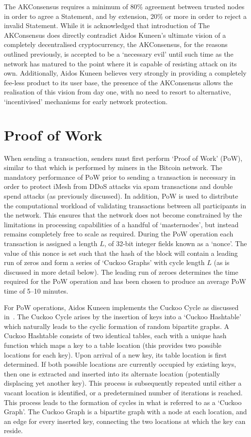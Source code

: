 \documentclass[a4paper,10pt,twocolumn]{article}
\begin{document}
The AKConsensus requires a minimum of 80\% agreement between trusted nodes in order to agree a Statement, and by extension, 
20\% or more in order to reject a invalid Statement.
While it is acknowledged that introduction of The AKConsensus does directly contradict Aidos Kuneen's ultimate 
vision of a completely decentralised cryptocurrency, the AKConsensus, for the reasons outlined previously, is accepted to be a
`necessary evil' until such time as the network has matured to the point where it is capable of resisting attack on its own. 
Additionally, Aidos Kuneen believes very strongly in providing a completely fee-less product to its user base,
the presence of the AKConsensus allows the realisation of this vision from day one, with no need to resort to alternative, `incentivised' 
mechanisms for early network protection.

\section{Proof of Work}
\label{sec:PoW}

When sending a transaction, senders must first perform `Proof of Work' (PoW), similar to that which is performed by miners in the 
Bitcoin network. The mandatory performance of PoW prior to sending a transaction is necessary in order to protect iMesh from DDoS 
attacks via spam transactions and double spend attacks (as previously discussed). In addition, PoW is used to distribute the 
computational workload of validating transactions between all participants in the network. This ensures that the network does not 
become constrained by the limitations in processing capabilities of a handful of `masternodes', but instead remains completely free to 
scale as required. During the PoW operation each transaction is assigned a length \(L\), of 32-bit integer fields known as a `nonce'. 
The value of this nonce is set such that the hash of the block will contain a leading run of zeros and form a series of `Cuckoo Graphs' with cycle length \(L\) (as is discussed in more detail below). The leading run of zeroes determines the time required for the PoW operation and has been chosen to produce an 
average PoW time of 5--10 minutes.

For PoW operations, Aidos Kuneen implements the Cuckoo Cycle as discussed in~\cite{cuckoo}. The Cuckoo Cycle arises by the insertion of
keys into a `Cuckoo Hashtable' which naturally leads to the cyclic formation of random bipartite graphs. A Cuckoo Hashtable consists of 
two identical tables, each with a unique hash function which maps a key to a table location (this provides two possible locations for 
each key). Upon arrival of a new key, its table location is first determined. If both possible locations are currently occupied by 
existing keys, then one is extracted and inserted into its alternate location (potentially displacing yet another key). This process is 
subsequently repeated until either a vacant location is identified, or a predetermined number of iterations is reached. This process 
leads to the formation of cycles in what is referred to as a `Cuckoo Graph'. The Cuckoo Graph is a bipartite graph with a node at each 
location, and an edge for every inserted key, connecting the two locations at which the key can reside.
\end{document}
